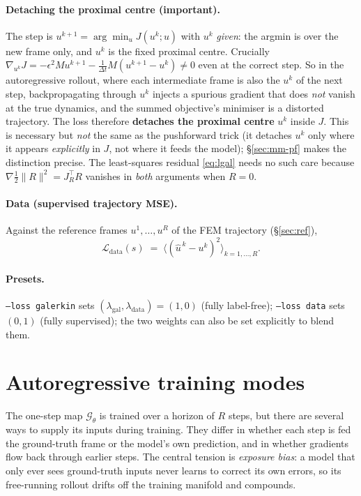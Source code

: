 \documentclass[11pt]{article}
\newcommand{\dt}{\Delta t}
\newcommand{\uhat}{\hat u}
\begin{document}
\paragraph{Detaching the proximal centre (important).} The step is $u^{k+1}=\arg\min_u J(u^k;u)$
with $u^k$ \emph{given}: the argmin is over the new frame only, and $u^k$ is the fixed proximal
centre. Crucially $\nabla_{u^k}J = -\epsilon^2 M u^{k+1}-\tfrac{1}{\dt}M(u^{k+1}-u^k)\neq 0$ even
at the correct step. So in the autoregressive rollout, where each intermediate frame is also the
$u^k$ of the next step, backpropagating through $u^k$ injects a spurious gradient that does
\emph{not} vanish at the true dynamics, and the summed objective's minimiser is a distorted
trajectory. The loss therefore \textbf{detaches the proximal centre} $u^k$ inside $J$. This is
necessary but \emph{not} the same as the pushforward trick (it detaches $u^k$ only where it appears
\emph{explicitly} in $J$, not where it feeds the model); \S\ref{sec:mm-pf} makes the distinction
precise. The least-squares residual \eqref{eq:lgal} needs no such care because
$\nabla\tfrac12\|R\|^2=J_R^\top R$ vanishes in \emph{both} arguments when $R=0$.

\paragraph{Data (supervised trajectory MSE).}
Against the reference frames $u^{1},\dots,u^{R}$ of the FEM trajectory (\S\ref{sec:ref}),
\begin{equation}
  \mathcal L_{\mathrm{data}}(s)\;=\;\big\langle (\uhat^{\,k}-u^{k})^2\big\rangle_{k=1,\dots,R}.
\end{equation}

\paragraph{Presets.} \texttt{--loss galerkin} sets $(\lambda_{\mathrm{gal}},\lambda_{\mathrm{data}})=(1,0)$
(fully label-free); \texttt{--loss data} sets $(0,1)$ (fully supervised); the two weights can also
be set explicitly to blend them.

\section{Autoregressive training modes}
\label{sec:artrain}

The one-step map $\mathcal G_\theta$ is trained over a horizon of $R$ steps, but there are several
ways to supply its inputs during training. They differ in whether each step is fed the ground-truth
frame or the model's own prediction, and in whether gradients flow back through earlier steps. The
central tension is \emph{exposure bias}: a model that only ever sees ground-truth inputs never
learns to correct its own errors, so its free-running rollout drifts off the training manifold and
compounds.
\end{document}
